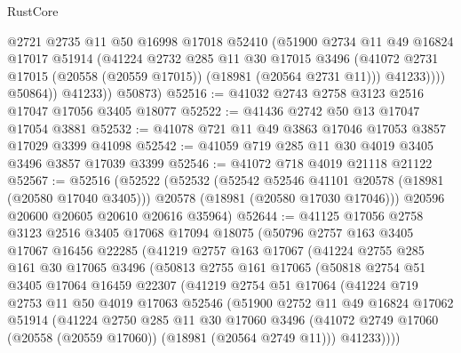 \begin{lexlean}{RustCore}
\begin{coremodule}
                  @2721
                  @2735
                  @11
                  @50
                  @16998
                  @17018
                  @52410
                  (@51900
                    @2734
                    @11
                    @49
                    @16824
                    @17017
                    @51914
                    (@41224
                      @2732
                      @285
                      @11
                      @30
                      @17015
                      @3496
                      (@41072 @2731 @17015 (@20558 (@20559 @17015)) (@18981 (@20564 @2731 @11)))
                      @41233))))
              @50864))
          @41233))
      @50873)
@52516 := @41032 @2743 @2758 @3123 @2516 @17047 @17056 @3405 @18077
@52522 := @41436 @2742 @50 @13 @17047 @17054 @3881
@52532 := @41078 @721 @11 @49 @3863 @17046 @17053 @3857 @17029 @3399 @41098
@52542 := @41059 @719 @285 @11 @30 @4019 @3405 @3496 @3857 @17039 @3399
@52546 := @41072 @718 @4019 @21118 @21122
@52567 := @52516
    (@52522
      (@52532
        (@52542 @52546 @41101 @20578 (@18981 (@20580 @17040 @3405)))
        @20578
        (@18981 (@20580 @17030 @17046)))
      @20596
      @20600
      @20605
      @20610
      @20616
      @35964)
@52644 := @41125
    @17056
    @2758
    @3123
    @2516
    @3405
    @17068
    @17094
    @18075
    (@50796
      @2757
      @163
      @3405
      @17067
      @16456
      @22285
      (@41219
        @2757
        @163
        @17067
        (@41224
          @2755
          @285
          @161
          @30
          @17065
          @3496
          (@50813
            @2755
            @161
            @17065
            (@50818
              @2754
              @51
              @3405
              @17064
              @16459
              @22307
              (@41219
                @2754
                @51
                @17064
                (@41224
                  @719
                  @2753
                  @11
                  @50
                  @4019
                  @17063
                  @52546
                  (@51900
                    @2752
                    @11
                    @49
                    @16824
                    @17062
                    @51914
                    (@41224
                      @2750
                      @285
                      @11
                      @30
                      @17060
                      @3496
                      (@41072 @2749 @17060 (@20558 (@20559 @17060)) (@18981 (@20564 @2749 @11)))
                      @41233))))

\end{coremodule}
\end{lexlean}
